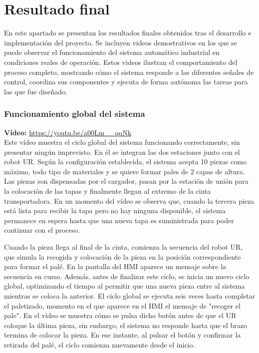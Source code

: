 \section{Resultado final}
\label{sec:resultado_final}

En este apartado se presentan los resultados finales obtenidos tras el desarrollo e implementación del proyecto. Se incluyen videos demostrativos en los que se puede observar el funcionamiento del sistema automático industrial en condiciones reales de operación. Estos videos ilustran el comportamiento del proceso completo, mostrando cómo el sistema responde a las diferentes señales de control, coordina sus componentes y ejecuta de forma autónoma las tareas para las que fue diseñado. 

\clearpage

\subsubsection{Funcionamiento global del sistema}

\textbf{Vídeo:} \url{https://youtu.be/a00Lm__qqNk} \\

Este vídeo muestra el ciclo global del sistema funcionando correctamente, sin presentar ningún imprevisto. En él se integran las dos estaciones junto con el robot UR. Según la configuración establecida, el sistema acepta 10 piezas como máximo, todo tipo de materiales y se quiere formar pales de 2 capas de altura. Las piezas son dispensadas por el cargador, pasan por la estación de unión para la colocación de las tapas y finalmente llegan al extremo de la cinta transportadora. En un momento del vídeo se observa que, cuando la tercera pieza está lista para recibir la tapa pero no hay ninguna disponible, el sistema permanece en espera hasta que una nueva tapa es suministrada para poder continuar con el proceso. 

Cuando la pieza llega al final de la cinta, comienza la secuencia del robot UR, que simula la recogida y  colocación de la pieza en la posición correspondiente para formar el palé. En la pantalla del HMI aparece un mensaje sobre la secuencia en curso. Además, antes de finalizar este ciclo, se inicia un nuevo ciclo global, optimizando el tiempo al permitir que una nueva pieza entre al sistema mientras se coloca la anterior. El ciclo global se ejecuta seis veces hasta completar el paletizado, momento en el que aparece en el HMI el mensaje de "recoger el pale". En el vídeo se muestra cómo se pulsa dicho botón antes de que el UR coloque la última pieza, sin embargo, el sistema no responde hasta que el brazo termina de colocar la pieza. En ese instante, al pulsar el botón y confirmar la retirada del palé, el ciclo comienza nuevamente desde el inicio. \\

